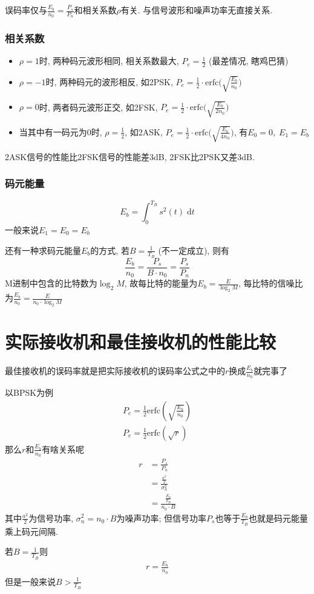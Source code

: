 \documentclass[a4paper]{report}
\begin{document}
误码率仅与$\frac{E_b}{n_0}=\frac{P_s}{P_n}$和相关系数$\rho$有关. 与信号波形和噪声功率无直接关系. 
\subsubsection{相关系数}
\begin{itemize}
  \item $\rho=1$时, 两种码元波形相同, 相关系数最大, $P_e=\frac{1}{2}$ (最差情况, 瞎鸡巴猜)
  \item $\rho=-1$时, 两种码元的波形相反, 如2PSK, $  P_e=\frac{1}{2}\cdot \text{erfc}\big(\sqrt{\frac{E_b}{n_0}}\big)$
  \item $\rho=0$时, 两者码元波形正交, 如2FSK, $  P_e=\frac{1}{2}\cdot \text{erfc}\big(\sqrt{\frac{E_b}{2n_0}}\big)$
  \item 当其中有一码元为0时, $\rho=\frac{1}{2}$, 如2ASK, $  P_e=\frac{1}{2}\cdot \text{erfc}\big(\sqrt{\frac{E_b}{4n_0}}\big)$, 有$E_0=0,\; E_1=E_b$
\end{itemize}

2ASK信号的性能比2FSK信号的性能差3dB, 2FSK比2PSK又差3dB. 

\subsubsection{码元能量}
\begin{equation}
  E_b=\int_0^{T_B} s^2(t)\; \text{d}t
\end{equation}
一般来说$E_1=E_0=E_b$

还有一种求码元能量$E_b$的方式, 若$B=\frac{1}{T_B}$ (不一定成立), 则有
\begin{equation}
  \frac{E_b}{n_0}=\frac{P_s}{B\cdot n_0}=\frac{P_s}{P_n}
\end{equation}
M进制中包含的比特数为$\log_2{M}$, 故每比特的能量为$E_b=\frac{E}{\log_2{M}}$, 每比特的信噪比为$\frac{E_b}{n_0}=\frac{E}{n_0\cdot \log_2{M}}$
\section{实际接收机和最佳接收机的性能比较}
最佳接收机的误码率就是把实际接收机的误码率公式之中的$r$换成$\frac{E_b}{n_0}$就完事了

以BPSK为例
\begin{align*}
  P_e=\frac{1}{2}\text{erfc}(\sqrt{\frac{E_b}{n_0}})\\
  P_e=\frac{1}{2}\text{erfc}(\sqrt{r})
\end{align*}
那么$r$和$\frac{E_b}{n_0}$有啥关系呢
\begin{align*}
  r&=\frac{P_s}{P_n}
  \\ &=\frac{\frac{a^2}{2}}{\sigma_n^2}
  \\ &=\frac{\frac{E_b}{T_B}}{n_0\cdot B}
\end{align*}
其中$\frac{a^2}{2}$为信号功率, $\sigma_n^2=n_0\cdot B$为噪声功率; 但信号功率$P_s$也等于$\frac{E_b}{T_B}$也就是码元能量乘上码元间隔. 

若$B=\frac{1}{T_B}$则
\begin{align*}
  r=\frac{E_b}{n_0}
\end{align*}
但是一般来说$B>\frac{1}{T_B}$
\end{document}
